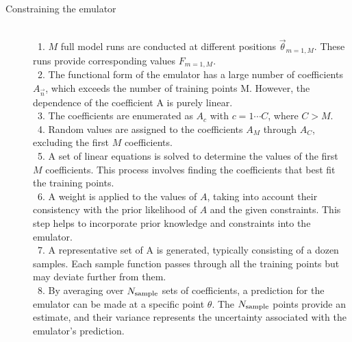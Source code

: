 \documentclass[12pt]{article}
\numberwithin{equation}{section}
\numberwithin{figure}{section}
\begin{document}
\begin{description}
\item[Constraining the emulator] \
\\
\ 1. $M$ full model runs are conducted at different positions $\vec{\theta}_{m=1,M}$. These runs provide corresponding values $F_{m=1,M}$. \\

\ 2. The functional form of the emulator has a large number of coefficients $A_{\vec{n}}$, which exceeds the number of training points M. However, the dependence of the coefficient A is purely linear. \\

\ 3. The coefficients are enumerated as $A_c$ with $c=1\cdots C$, where $C>M$.\\

\ 4. Random values are assigned to the coefficients $A_M$ through $A_C$, excluding the first $M$ coefficients. \\

\ 5. A set of linear equations is solved to determine the values of the first $M$ coefficients. This process involves finding the coefficients that best fit the training points. \\

\ 6. A weight is applied to the values of $A$, taking into account their consistency with the prior likelihood of $A$ and the given constraints. This step helps to incorporate prior knowledge and constraints into the emulator. \\

\ 7. A representative set of A is generated, typically consisting of a dozen samples. Each sample function passes through all the training points but may deviate further from them. \\

\ 8. By averaging over $N_{\rm sample}$ sets of coefficients, a prediction for the emulator can be made at a specific point $\theta$. The $N_{\rm sample}$ points provide an estimate, and their variance represents the uncertainty associated with the emulator's prediction. \\

\end{description}
\end{document}
